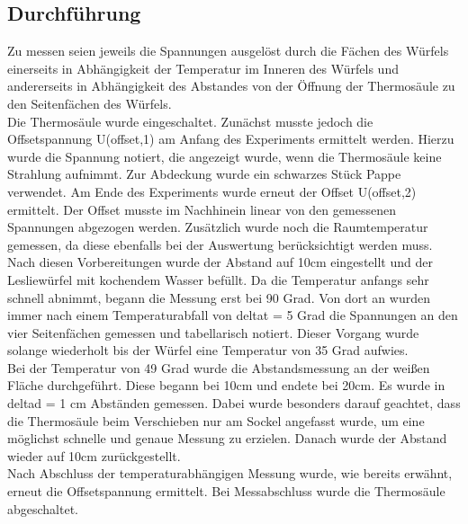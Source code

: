 \subsection{Durchführung}
Zu messen seien jeweils die Spannungen ausgelöst durch die Fächen des Würfels einerseits in Abhängigkeit der Temperatur im Inneren des Würfels und andererseits in Abhängigkeit des Abstandes von der Öffnung der Thermosäule zu den Seitenfächen des Würfels. \\
Die Thermosäule wurde eingeschaltet.
Zunächst musste jedoch die Offsetspannung U(offset,1) am Anfang des Experiments ermittelt werden.
Hierzu wurde die Spannung notiert, die angezeigt wurde, wenn die Thermosäule keine Strahlung aufnimmt.
Zur Abdeckung wurde ein schwarzes Stück Pappe verwendet.
Am Ende des Experiments wurde erneut der Offset U(offset,2) ermittelt.
Der Offset musste im Nachhinein linear von den gemessenen Spannungen abgezogen werden.
Zusätzlich wurde noch die Raumtemperatur gemessen, da diese ebenfalls bei der Auswertung berücksichtigt werden muss. \\
Nach diesen Vorbereitungen wurde der Abstand auf 10cm eingestellt und der Lesliewürfel mit kochendem Wasser befüllt.
Da die Temperatur anfangs sehr schnell abnimmt, begann die Messung erst bei 90 Grad.
Von dort an wurden immer nach einem Temperaturabfall von deltat = 5 Grad die Spannungen an den vier Seitenfächen gemessen und tabellarisch notiert.
Dieser Vorgang wurde solange wiederholt bis der Würfel eine Temperatur von 35 Grad aufwies. \\
Bei der Temperatur von 49 Grad wurde die Abstandsmessung an der weißen Fläche durchgeführt.
Diese begann bei 10cm und endete bei 20cm.
Es wurde in deltad = 1 cm Abständen gemessen.
Dabei wurde besonders darauf geachtet, dass die Thermosäule beim Verschieben nur am Sockel angefasst wurde, um eine möglichst schnelle und genaue Messung zu erzielen.
Danach wurde der Abstand wieder auf 10cm zurückgestellt.\\
Nach Abschluss der temperaturabhängigen Messung wurde, wie bereits erwähnt, erneut die Offsetspannung ermittelt.
Bei Messabschluss wurde die Thermosäule abgeschaltet.
